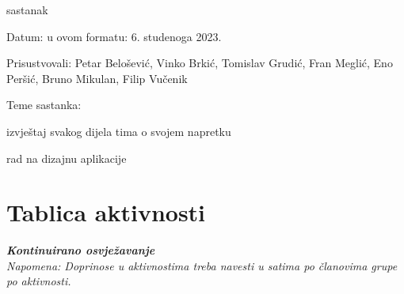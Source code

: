 \begin{packed_enum}
			\item  sastanak
			\item[] \begin{packed_item}
				\item Datum: u ovom formatu: 6. studenoga 2023.
				\item Prisustvovali: Petar Belošević, Vinko Brkić, Tomislav Grudić, Fran Meglić, Eno Peršić, Bruno Mikulan, Filip Vučenik
				\item Teme sastanka:
				\begin{packed_item}
					\item  izvještaj svakog dijela tima o svojem napretku
					\item rad na dizajnu aplikacije
				\end{packed_item}
			\end{packed_item}
			
		\end{packed_enum}
		
		\eject
		\section*{Tablica aktivnosti}
		
			\textbf{\textit{Kontinuirano osvježavanje}}\\
			
			 \textit{Napomena: Doprinose u aktivnostima treba navesti u satima po članovima grupe po aktivnosti.}

